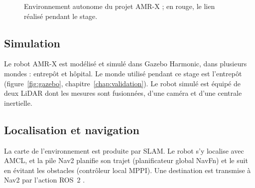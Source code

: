 \begin{figure}[htbp]
\centering
{}
\caption{Environnement autonome du projet AMR-X ; en rouge, le lien réalisé pendant le stage.}
\label{fig:environnement}
\end{figure}

\subsection{Simulation}
Le robot AMR-X est modélisé et simulé dans Gazebo Harmonic, dans plusieurs mondes :
entrepôt et hôpital. Le monde utilisé pendant ce stage est l'entrepôt
 (figure~\ref{fig:gazebo}, chapitre~\ref{chap:validation}). Le
robot simulé est équipé de deux LiDAR dont les mesures sont fusionnées, d'une caméra et
d'une centrale inertielle.

\subsection{Localisation et navigation}
La carte de l'environnement est produite par SLAM. Le robot s'y localise avec AMCL, et la
pile Nav2 planifie son trajet (planificateur global NavFn) et le suit en évitant les
obstacles (contrôleur local MPPI). Une destination est transmise à Nav2 par l'action
ROS~2 .

